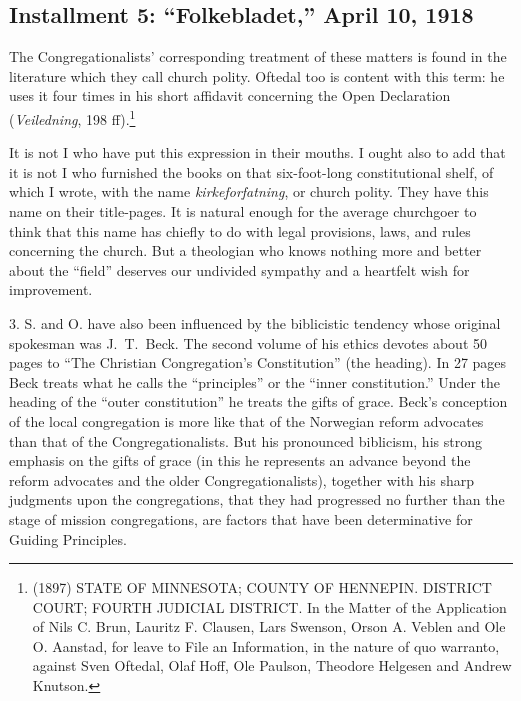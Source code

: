 


\subsection{Installment 5: ``Folkebladet,'' April 10, 1918}

The Congregationalists' corresponding treatment of these matters is found in the literature which they call church polity. Oftedal too is content with this term: he uses it four times in his short affidavit concerning the Open Declaration (\textit{Veiledning}, 198 ff).\footnote{(1897) STATE OF MINNESOTA; COUNTY OF HENNEPIN. DISTRICT COURT; FOURTH JUDICIAL DISTRICT. In the Matter of the Application of Nils C. Brun, Lauritz F. Clausen, Lars Swenson, Orson A. Veblen and Ole O. Aanstad, for leave to File an Information, in the nature of quo warranto, against Sven Oftedal, Olaf Hoff, Ole Paulson, Theodore Helgesen and Andrew Knutson.}

It is not I who have put this expression in their mouths. I ought also to add that it is not I who furnished the books on that six-foot-long constitutional shelf, of which I wrote, with the name \textit{kirkeforfatning}, or church polity. They have this name on their title-pages. It is natural enough for the average churchgoer to think that this name has chiefly to do with legal provisions, laws, and rules concerning the church. But a theologian who knows nothing more and better about the ``field'' deserves our undivided sympathy and a heartfelt wish for improvement.

3. S. and O. have also been influenced by the biblicistic tendency whose original spokesman was J.~T.~Beck. The second volume of his ethics devotes about 50 pages to ``The Christian Congregation’s Constitution'' (the heading). In 27 pages Beck treats what he calls the ``principles'' or the ``inner constitution.'' Under the heading of the ``outer constitution'' he treats the gifts of grace. Beck's conception of the local congregation is more like that of the Norwegian reform advocates than that of the Congregationalists. But his pronounced biblicism, his strong emphasis on the gifts of grace (in this he represents an advance beyond the reform advocates and the older Congregationalists), together with his sharp judgments upon the congregations, that they had progressed no further than the stage of mission congregations, are factors that have been determinative for Guiding Principles.

